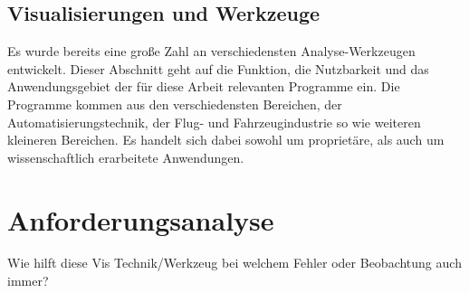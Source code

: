 \documentclass[draft=false
              ,paper=a4
              ,twoside=false
              ,fontsize=11pt
              ,headsepline
              ,BCOR10mm
              ,DIV11
              ]{scrbook}
\newcommand{\TODO}[1]{\colorbox{yellow}{\textcolor{red}{[TODO: #1]}}}
\begin{document}
\section{Visualisierungen und Werkzeuge} %
\label{sec:anwendungen_und_werkzeuge}
Es wurde bereits eine große Zahl an verschiedensten Analyse-Werkzeugen entwickelt. Dieser Abschnitt geht auf die Funktion, die Nutzbarkeit und das Anwendungsgebiet der für diese Arbeit relevanten Programme ein. Die Programme kommen aus den verschiedensten Bereichen, der Automatisierungstechnik, der Flug- und Fahrzeugindustrie so wie weiteren kleineren Bereichen. Es handelt sich dabei sowohl um proprietäre, als auch um wissenschaftlich erarbeitete Anwendungen. 

\chapter{Anforderungsanalyse} %
\label{cha:anforderungsanalyse}

\iffalse
Wie hilft diese Vis Technik/Werkzeug bei welchem Fehler oder Beobachtung auch immer?
\end{document}

